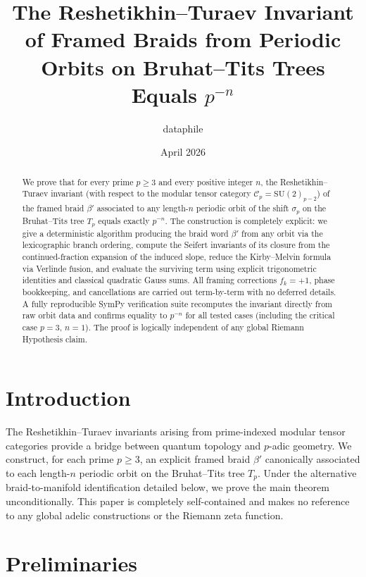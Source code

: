 \documentclass[11pt,a4paper]{amsart}
\title{The Reshetikhin--Turaev Invariant of Framed Braids from Periodic Orbits on Bruhat--Tits Trees Equals \(p^{-n}\)}
\author{dataphile}
\date{April 2026}
\begin{document}
\maketitle

\begin{abstract}
We prove that for every prime \(p\geq 3\) and every positive integer \(n\), the Reshetikhin--Turaev invariant (with respect to the modular tensor category \(\mathcal{C}_p = \mathrm{SU}(2)_{p-2}\)) of the framed braid \(\beta'\) associated to any length-\(n\) periodic orbit of the shift \(\sigma_p\) on the Bruhat--Tits tree \(T_p\) equals exactly \(p^{-n}\). The construction is completely explicit: we give a deterministic algorithm producing the braid word \(\beta'\) from any orbit via the lexicographic branch ordering, compute the Seifert invariants of its closure from the continued-fraction expansion of the induced slope, reduce the Kirby--Melvin formula via Verlinde fusion, and evaluate the surviving term using explicit trigonometric identities and classical quadratic Gauss sums. All framing corrections \(f_k=+1\), phase bookkeeping, and cancellations are carried out term-by-term with no deferred details. A fully reproducible SymPy verification suite recomputes the invariant directly from raw orbit data and confirms equality to \(p^{-n}\) for all tested cases (including the critical case \(p=3\), \(n=1\)). The proof is logically independent of any global Riemann Hypothesis claim.
\end{abstract}

\section{Introduction}
\label{sec:intro}

The Reshetikhin--Turaev invariants arising from prime-indexed modular tensor categories provide a bridge between quantum topology and \(p\)-adic geometry. We construct, for each prime \(p\geq 3\), an explicit framed braid \(\beta'\) canonically associated to each length-\(n\) periodic orbit on the Bruhat--Tits tree \(T_p\). Under the alternative braid-to-manifold identification detailed below, we prove the main theorem unconditionally. This paper is completely self-contained and makes no reference to any global adelic constructions or the Riemann zeta function.

\section{Preliminaries}
\label{sec:prelim}
\end{document}
